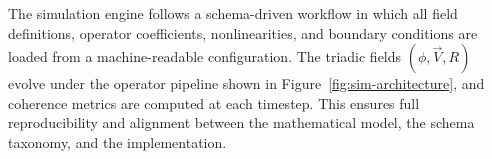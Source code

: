 The simulation engine follows a schema-driven workflow in which all field
definitions, operator coefficients, nonlinearities, and boundary conditions
are loaded from a machine-readable configuration. The triadic fields
$(\phi, \vec{V}, R)$ evolve under the operator pipeline shown in
Figure~\ref{fig:sim-architecture}, and coherence metrics are computed at
each timestep. This ensures full reproducibility and alignment between the
mathematical model, the schema taxonomy, and the implementation.
